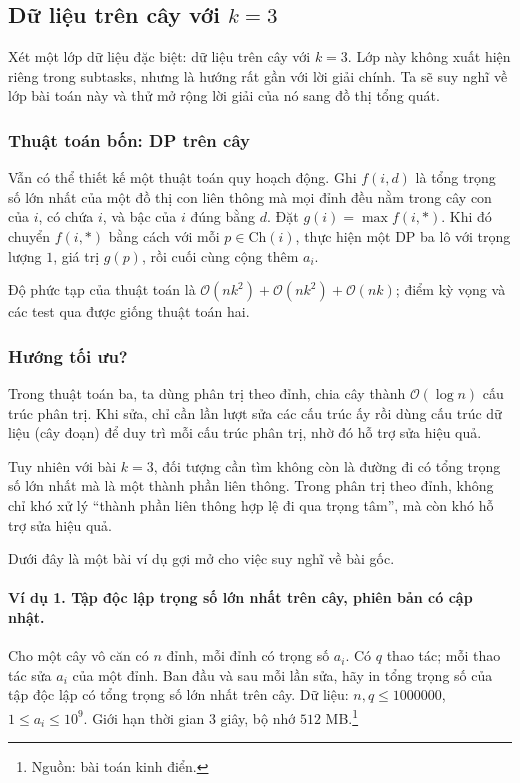 \documentclass[11pt]{article}
\newcommand{\Oh}{\mathcal{O}}
\begin{document}
\subsection{Dữ liệu trên cây với \texorpdfstring{\(k=3\)}{k=3}}

Xét một lớp dữ liệu đặc biệt: dữ liệu trên cây với \(k=3\). Lớp này không xuất
hiện riêng trong subtasks, nhưng là hướng rất gần với lời giải chính. Ta sẽ
suy nghĩ về lớp bài toán này và thử mở rộng lời giải của nó sang đồ thị tổng
quát.

\subsubsection{Thuật toán bốn: DP trên cây}

Vẫn có thể thiết kế một thuật toán quy hoạch động. Ghi \(f(i,d)\) là tổng
trọng số lớn nhất của một đồ thị con liên thông mà mọi đỉnh đều nằm trong cây
con của \(i\), có chứa \(i\), và bậc của \(i\) đúng bằng \(d\). Đặt
\(g(i)=\max f(i,*)\). Khi đó chuyển \(f(i,*)\) bằng cách với mỗi
\(p\in\mathrm{Ch}(i)\), thực hiện một DP ba lô với trọng lượng \(1\), giá trị
\(g(p)\), rồi cuối cùng cộng thêm \(a_i\).

Độ phức tạp của thuật toán là \(\Oh(nk^2)+\Oh(nk^2)+\Oh(nk)\); điểm kỳ vọng và
các test qua được giống thuật toán hai.

\subsubsection{Hướng tối ưu?}

Trong thuật toán ba, ta dùng phân trị theo đỉnh, chia cây thành
\(\Oh(\log n)\) cấu trúc phân trị. Khi sửa, chỉ cần lần lượt sửa các cấu trúc
ấy rồi dùng cấu trúc dữ liệu (cây đoạn) để duy trì mỗi cấu trúc phân trị, nhờ
đó hỗ trợ sửa hiệu quả.

Tuy nhiên với bài \(k=3\), đối tượng cần tìm không còn là đường đi có tổng
trọng số lớn nhất mà là một thành phần liên thông. Trong phân trị theo đỉnh,
không chỉ khó xử lý ``thành phần liên thông hợp lệ đi qua trọng tâm'', mà còn
khó hỗ trợ sửa hiệu quả.

Dưới đây là một bài ví dụ gợi mở cho việc suy nghĩ về bài gốc.

\paragraph{Ví dụ 1. Tập độc lập trọng số lớn nhất trên cây, phiên bản có cập nhật.}
Cho một cây vô căn có \(n\) đỉnh, mỗi đỉnh có trọng số \(a_i\). Có \(q\) thao
tác; mỗi thao tác sửa \(a_i\) của một đỉnh. Ban đầu và sau mỗi lần sửa, hãy in
tổng trọng số của tập độc lập có tổng trọng số lớn nhất trên cây. Dữ liệu:
\(n,q\le 1000000\), \(1\le a_i\le 10^9\). Giới hạn thời gian \(3\) giây, bộ
nhớ \(512\) MB.\footnote{Nguồn: bài toán kinh điển.}
\end{document}
